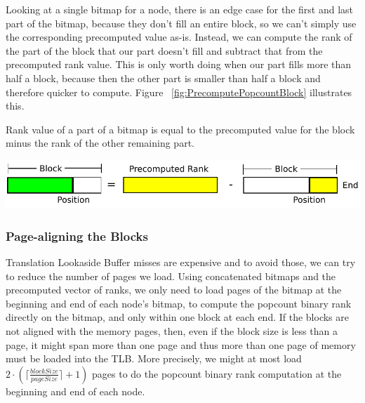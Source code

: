 Looking at a single bitmap for a node, there is an edge case for the first and last part of the bitmap, because they don't fill an entire block, so we can't simply use the corresponding precomputed value as-is.
Instead, we can compute the rank of the part of the block that our part doesn't fill and subtract that from the precomputed rank value.
This is only worth doing when our part fills more than half a block, because then the other part is smaller than half a block and therefore quicker to compute.
Figure ~\ref{fig:PrecomputePopcountBlock} illustrates this.



\figureBegin
\caption{Rank value of a part of a bitmap is equal to the precomputed value for the block minus the rank of the other remaining part.}
\label{fig:PrecomputePopcountBlock}
\includegraphics[width=\textwidth]{PrecomputePopcountBlock.pdf}
\figureEnd








\subsubsection{Page-aligning the Blocks}
Translation Lookaside Buffer misses are expensive and to avoid those, we can try to reduce the number of pages we load.
Using concatenated bitmaps and the precomputed vector of ranks, we only need to load pages of the bitmap at the beginning and end of each node's bitmap, to compute the popcount binary rank directly on the bitmap, and only within one block at each end.
If the blocks are not aligned with the memory pages, then, even if the block size is less than a page, it might span more than one page and thus more than one page of memory must be loaded into the TLB.
More precisely, we might at most load $2 \cdot \left( \lceil\frac{blockSize}{pageSize}\rceil +1 \right)$ pages to do the popcount binary rank computation at the beginning and end of each node.

